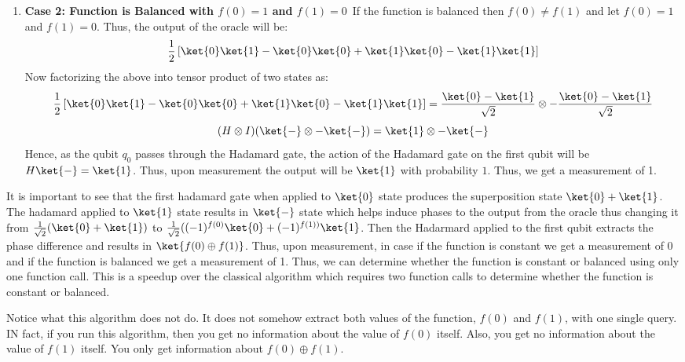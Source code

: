 \documentclass[12pt, oneside]{book}
\theoremstyle{definition}
\theoremstyle{definition}
\theoremstyle{remark}
\begin{document}
\begin{enumerate}
    \item \textbf{Case 2: Function is Balanced with $f(0)=1$ and $f(1)=0$}\
    If the function is balanced then $f(0)\neq f(1)$ and let $f(0)=1$ and $f(1)=0$. Thus, the output of the oracle will be:
    \[
        \frac{1}{2}\left[\ket{0}\ket{1}-\ket{0}\ket{0}+\ket{1}\ket{0}-\ket{1}\ket{1}\right]
    \]
    Now factorizing the above into tensor product of two states as:
    \[
        \frac{1}{2}\left[\ket{0}\ket{1}-\ket{0}\ket{0}+\ket{1}\ket{0}-\ket{1}\ket{1}\right]=\frac{\ket{0}-\ket{1}}{\sqrt{2}}\otimes -\frac{\ket{0}-\ket{1}}{\sqrt{2}}
    \]
    \[
        (H\otimes I)(\ket{-} \otimes -\ket{-})=\ket{1}\otimes -\ket{-}
    \]
    Hence, as the qubit $q_0$ passes through the Hadamard gate, the action of the Hadamard gate on the first qubit will be $H\ket{-}=\ket{1}$.
    Thus, upon measurement the output will be $\ket{1}$ with probability $1$. Thus, we get a measurement of 1.
\end{enumerate}

It is important to see that the first hadamard gate when applied to $\ket{0}$ state produces the superposition state $\ket{0}+\ket{1}$. The hadamard applied to $\ket{1}$ state results in $\ket{-}$ state which helps induce phases to the output from the oracle thus changing it from $\frac{1}{\sqrt{2}}(\ket{0}+\ket{1})$ to $\frac{1}{\sqrt{2}}((-1)^{f(0)}\ket{0}+(-1)^{f(1))}\ket{1}$. Then the Hadarmard applied to the first qubit extracts the phase difference and results in $\ket{f(0) \oplus f(1)}$. Thus, upon measurement, in case if the function is constant we get a measurement of 0 and if the function is balanced we get a measurement of 1. Thus, we can determine whether the function is constant or balanced using only one function call. This is a speedup over the classical algorithm which requires two function calls to determine whether the function is constant or balanced.

Notice what this algorithm does not do. It does not somehow extract both values of the function, $f(0)$ and $f(1)$, with one single query. IN fact, if you run this algorithm, then you get no information about the value of $f(0)$ itself. Also, you get no information about the value of $f(1)$ itself. You only get information about $f(0) \oplus f(1)$.
\end{document}

